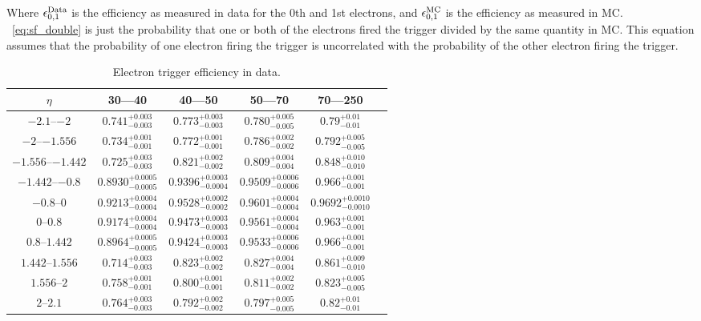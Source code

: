Where $\epsilon^{\text{Data}}_{0,1}$ is the efficiency as measured in data for the 0th and
1st electrons, and $\epsilon^{\text{MC}}_{0,1}$ is the efficiency as measured in MC.
\EQ~\ref{eq:sf_double} is just the probability that one or both of the
electrons fired the trigger divided by the same quantity in MC. This equation
assumes that the probability of one electron firing the trigger is uncorrelated
with the probability of the other electron firing the trigger.

\begin{table}[h]
\begin{center}
    \begin{tabular}{ | c | c | c | c | c | c |} \hline
	$\eta$ & 30---40 \GeV & 40---50 \GeV & 50---70 \GeV & 70---250 \GeV  \\ \hline
	$\numrange{-2.1}{-2}$ & $0.741^{+0.003}_{-0.003}$ & $0.773^{+0.003}_{-0.003}$ & $0.780^{+0.005}_{-0.005}$ & $0.79^{+0.01}_{-0.01}$  \\ \hline
	$\numrange{-2}{-1.556}$ & $0.734^{+0.001}_{-0.001}$ & $0.772^{+0.001}_{-0.001}$ & $0.786^{+0.002}_{-0.002}$ & $0.792^{+0.005}_{-0.005}$  \\ \hline
	$\numrange{-1.556}{-1.442}$ & $0.725^{+0.003}_{-0.003}$ & $0.821^{+0.002}_{-0.002}$ & $0.809^{+0.004}_{-0.004}$ & $0.848^{+0.010}_{-0.010}$  \\ \hline
	$\numrange{-1.442}{-0.8}$ & $0.8930^{+0.0005}_{-0.0005}$ & $0.9396^{+0.0003}_{-0.0004}$ & $0.9509^{+0.0006}_{-0.0006}$ & $0.966^{+0.001}_{-0.001}$  \\ \hline
	$\numrange{-0.8}{0}$ & $0.9213^{+0.0004}_{-0.0004}$ & $0.9528^{+0.0002}_{-0.0002}$ & $0.9601^{+0.0004}_{-0.0004}$ & $0.9692^{+0.0010}_{-0.0010}$  \\ \hline
	$\numrange{0}{0.8}$ & $0.9174^{+0.0004}_{-0.0004}$ & $0.9473^{+0.0003}_{-0.0003}$ & $0.9561^{+0.0004}_{-0.0004}$ & $0.963^{+0.001}_{-0.001}$  \\ \hline
	$\numrange{0.8}{1.442}$ & $0.8964^{+0.0005}_{-0.0005}$ & $0.9424^{+0.0003}_{-0.0003}$ & $0.9533^{+0.0006}_{-0.0006}$ & $0.966^{+0.001}_{-0.001}$  \\ \hline
	$\numrange{1.442}{1.556}$ & $0.714^{+0.003}_{-0.003}$ & $0.823^{+0.002}_{-0.002}$ & $0.827^{+0.004}_{-0.004}$ & $0.861^{+0.009}_{-0.010}$  \\ \hline
	$\numrange{1.556}{2}$ & $0.758^{+0.001}_{-0.001}$ & $0.800^{+0.001}_{-0.001}$ & $0.811^{+0.002}_{-0.002}$ & $0.823^{+0.005}_{-0.005}$  \\ \hline
	$\numrange{2}{2.1}$ & $0.764^{+0.003}_{-0.003}$ & $0.792^{+0.002}_{-0.002}$ & $0.797^{+0.005}_{-0.005}$ & $0.82^{+0.01}_{-0.01}$  \\ \hline
    \end{tabular}
\end{center}
\centering
\caption{
    Electron trigger efficiency in data.
}
\label{trigger_eff_data}
\end{table}

